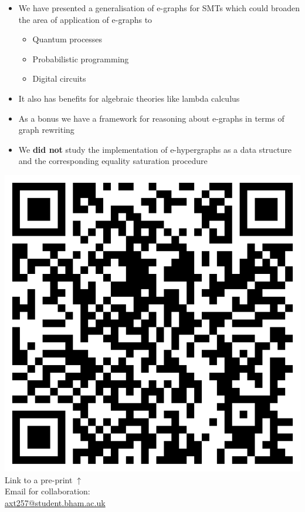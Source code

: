 \documentclass[aspectratio=169]{beamer}
\begin{document}
\begin{frame}{}
    \begin{minipage}{0.65\linewidth}
    \small
    \vfill
    \begin{itemize}
        \item We have presented a generalisation of e-graphs for SMTs which could broaden the area of application of e-graphs to
        \vfill
        \begin{itemize}
            \item Quantum processes
            \vfill
            \item Probabilistic programming
            \vfill
            \item Digital circuits
        \end{itemize}
        \vfill
        \item It also has benefits for algebraic theories like lambda calculus
        \vfill
        \item As a bonus we have a framework for reasoning about e-graphs in terms of graph rewriting
        \vfill
        \item We \textbf{did not} study the implementation of e-hypergraphs as a data structure and the corresponding equality saturation procedure
    \end{itemize}
\end{minipage}
\begin{minipage}{0.3\linewidth}
    \small
    \includegraphics[width=\linewidth]{figures/arxiv_qr}
    Link to a pre-print$\;\uparrow$\\

    Email for collaboration:\\
    \alert{\url{axt257@student.bham.ac.uk}}
\end{minipage}
\end{frame}
\end{document}
